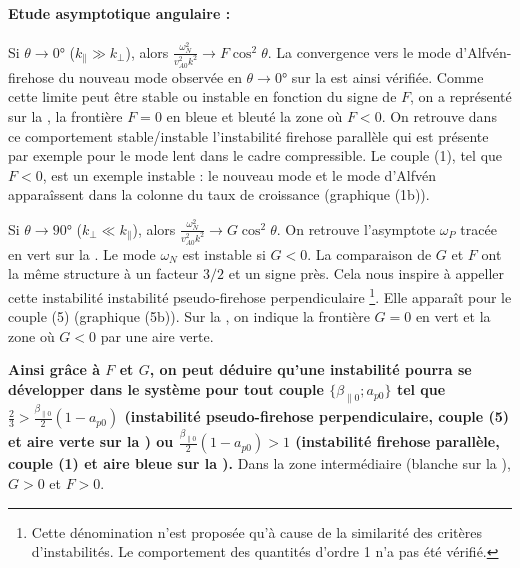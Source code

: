  \paragraph{Etude asymptotique angulaire : }Si $\theta \rightarrow \ang{0}$ ($k_{\parallel}\gg k_{\perp}$), alors $\frac{\omega^2_N}{v^2_{A0}k^2} \rightarrow F \cos^2 \theta$. La convergence vers le mode d'Alfvén-firehose du nouveau mode observée en $\theta \rightarrow \ang{0}$ sur la  est ainsi vérifiée. Comme cette limite peut être stable ou instable en fonction du signe de $F$, on a représenté sur la , la frontière $F=0$ en bleue et bleuté la zone où $F<0$. On retrouve dans ce comportement stable/instable l'instabilité firehose \og parallèle \fg{} qui est présente par exemple pour le mode lent dans le cadre compressible. Le couple (1), tel que $F<0$, est un exemple instable : le nouveau mode et le mode d'Alfvén apparaîssent dans la colonne du taux de croissance (graphique (1b)). 
 
 Si $\theta \rightarrow \ang{90}$ ($k_{\perp}\ll k_{\parallel} $), alors $\frac{\omega^2_N}{v^2_{A0}k^2} \rightarrow G \cos^2 \theta$. On retrouve l'asymptote $\omega_P$ tracée en vert sur la . Le mode $\omega_N$ est instable si $G<0$. La comparaison de $G$ et $F$ ont la même structure à un facteur $3/2$ et un signe près. Cela nous inspire à appeller cette instabilité \og instabilité pseudo-firehose perpendiculaire \fg{}\footnote{Cette dénomination n'est proposée qu'à cause de la similarité des critères d'instabilités. Le comportement des quantités d'ordre 1 n'a pas été vérifié.}. Elle apparaît pour le couple (5) (graphique (5b)). Sur la , on indique la frontière $G=0$ en vert et la zone où $G<0$ par une aire verte. 

 {\bf Ainsi grâce à $F$ et $G$, on peut déduire qu'une instabilité pourra se développer dans le système pour tout couple $\{\beta_{\parallel 0};a_{p0}\}$ tel que $\frac{2}{3}>\frac{\beta_{\parallel 0}}{2}(1-a_{p0})$ (instabilité pseudo-firehose perpendiculaire, couple (5) et aire verte sur la ) ou $\frac{\beta_{\parallel 0}}{2}(1-a_{p0})>1$ (instabilité firehose parallèle, couple (1) et aire bleue sur la ).} Dans la zone intermédiaire (blanche sur la ), $G>0$ et $F>0$. 


